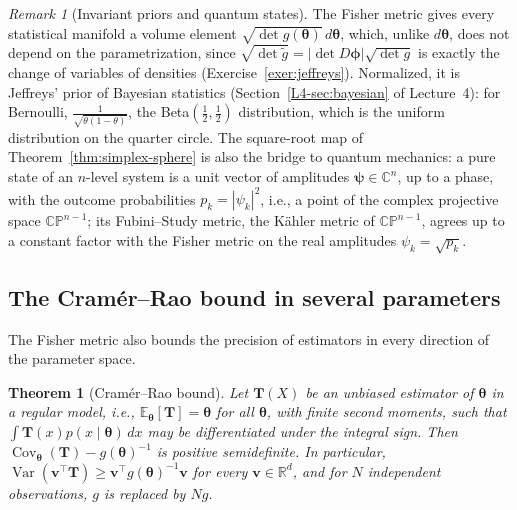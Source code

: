 \documentclass[11pt]{article}
\newcommand{\E}{\mathbb{E}}
\theoremstyle{definition}
\theoremstyle{plain}
\newtheorem{theorem}[definition]{Theorem}
\theoremstyle{remark}
\newtheorem{remark}[definition]{Remark}
\DeclareMathOperator{\Var}{Var}
\DeclareMathOperator{\Cov}{Cov}
\begin{document}
\begin{remark}[Invariant priors and quantum states]
    The Fisher metric gives every statistical manifold a volume element $\sqrt{\det g(\boldsymbol{\theta})}\, d\boldsymbol{\theta}$, which, unlike $d\boldsymbol{\theta}$, does not depend on the parametrization, since $\sqrt{\det\tilde g} = |\det D\boldsymbol{\phi}|\sqrt{\det g}$ is exactly the change of variables of densities (Exercise~\ref{exer:jeffreys}). Normalized, it is Jeffreys' prior of Bayesian statistics (Section~\ref{L4-sec:bayesian} of Lecture~4): for Bernoulli, $\frac{1}{\sqrt{\theta(1 - \theta)}}$, the Beta$(\frac{1}{2}, \frac{1}{2})$ distribution, which is the uniform distribution on the quarter circle. The square-root map of Theorem~\ref{thm:simplex-sphere} is also the bridge to quantum mechanics: a pure state of an $n$-level system is a unit vector of amplitudes $\boldsymbol{\psi} \in \mathbb{C}^n$, up to a phase, with the outcome probabilities $p_k = |\psi_k|^2$, i.e., a point of the complex projective space $\mathbb{CP}^{n-1}$; its Fubini--Study metric, the K\"ahler metric of $\mathbb{CP}^{n-1}$, agrees up to a constant factor with the Fisher metric on the real amplitudes $\psi_k = \sqrt{p_k}$.
\end{remark}

\subsection{The Cram\'er--Rao bound in several parameters}

The Fisher metric also bounds the precision of estimators in every direction of the parameter space.

\begin{theorem}[Cram\'er--Rao bound]\label{thm:cramer-rao-multi}
    Let $\mathbf{T}(X)$ be an unbiased estimator of $\boldsymbol{\theta}$ in a regular model, i.e., $\E_{\boldsymbol{\theta}}[\mathbf{T}] = \boldsymbol{\theta}$ for all $\boldsymbol{\theta}$, with finite second moments, such that $\int \mathbf{T}(x)p(x \mid \boldsymbol{\theta})\, dx$ may be differentiated under the integral sign. Then $\Cov_{\boldsymbol{\theta}}(\mathbf{T}) - g(\boldsymbol{\theta})^{-1}$ is positive semidefinite. In particular, $\Var(\mathbf{v}^\top\mathbf{T}) \geq \mathbf{v}^\top g(\boldsymbol{\theta})^{-1}\mathbf{v}$ for every $\mathbf{v} \in \mathbb{R}^d$, and for $N$ independent observations, $g$ is replaced by $Ng$.
\end{theorem}
\end{document}
